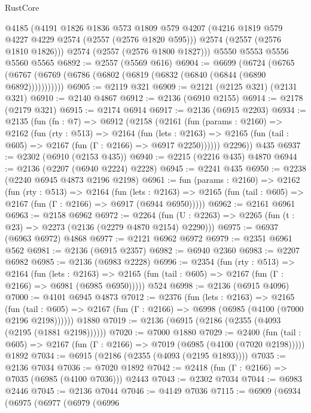 \begin{lexlean}{RustCore}
\begin{coremodule}
      @4185
      (@4191
        @1826
        @1836
        @573
        @1809
        @579
        @4207
        (@4216 @1819 @579 @4227 @4229 @2574 (@2557 (@2576 @1820 @595)))
        @2574
        (@2557 (@2576 @1810 @1826)))
      @2574
      (@2557 (@2576 @1800 @1827)))
    @5550
    @5553
    @5556
    @5560
    @5565
@6892 := @2557 (@5569 @616)
@6904 := @6699
    (@6724 (@6765 (@6767 (@6769 (@6786 (@6802 (@6819 (@6832 (@6840 (@6844 (@6890 @6892)))))))))))
@6905 := @2119 @321
@6909 := @2121 (@2125 @321) (@2131 @321)
@6910 := @2140 @4867
@6912 := @2136 (@6910 @2155)
@6914 := @2178 (@2179 @321)
@6915 := @2174 @6914
@6917 := @2136 (@6915 @2203)
@6934 := @2135
    (fun (fn : @7) =>
    @6912
      (@2158
        (@2161
          (fun (params : @2160) =>
          @2162
            (fun (rty : @513) =>
            @2164
              (fun (lets : @2163) =>
              @2165 (fun (tail : @605) => @2167 (fun (Γ : @2166) => @6917 @2250))))))
        @2296))
    @435
@6937 := @2302 (@6910 (@2153 @435))
@6940 := @2215 (@2216 @435) @4870
@6944 := @2136 (@2207 (@6940 @2224) @2228)
@6945 := @2241 @435
@6950 := @2238 (@2240 @6945 @4873 @2196 @2198)
@6961 := fun (params : @2160) =>
  @2162
    (fun (rty : @513) =>
    @2164
      (fun (lets : @2163) =>
      @2165 (fun (tail : @605) => @2167 (fun (Γ : @2166) => @6917 (@6944 @6950)))))
@6962 := @2161 @6961
@6963 := @2158 @6962
@6972 := @2264 (fun (U : @2263) => @2265 (fun (t : @23) => @2273 (@2136 (@2279 @4870 @2154) @2290)))
@6975 := @6937 (@6963 @6972) @4868
@6977 := @2121 @6962 @6972
@6979 := @2351 @6961 @562
@6981 := @2136 (@6915 @2357)
@6982 := @6940 @2360
@6983 := @2207 @6982
@6985 := @2136 (@6983 @2228)
@6996 := @2354
    (fun (rty : @513) =>
    @2164
      (fun (lets : @2163) =>
      @2165 (fun (tail : @605) => @2167 (fun (Γ : @2166) => @6981 (@6985 @6950)))))
    @524
@6998 := @2136 (@6915 @4096)
@7000 := @4101 @6945 @4873
@7012 := @2376
    (fun (lets : @2163) =>
    @2165
      (fun (tail : @605) => @2167 (fun (Γ : @2166) => @6998 (@6985 (@4100 (@7000 @2196 @2198))))))
    @1880
@7019 := @2136 (@6915 (@2186 (@2355 (@4093 (@2195 (@1881 @2198))))))
@7020 := @7000 @1880
@7029 := @2400
    (fun (tail : @605) => @2167 (fun (Γ : @2166) => @7019 (@6985 (@4100 (@7020 @2198)))))
    @1892
@7034 := @6915 (@2186 (@2355 (@4093 (@2195 @1893))))
@7035 := @2136 @7034
@7036 := @7020 @1892
@7042 := @2418 (fun (Γ : @2166) => @7035 (@6985 (@4100 @7036))) @2443
@7043 := @2302 @7034
@7044 := @6983 @2446
@7045 := @2136 @7044
@7046 := @4149 @7036
@7115 := @6909
    (@6934
      (@6975
        (@6977
          (@6979
            (@6996

\end{coremodule}
\end{lexlean}
